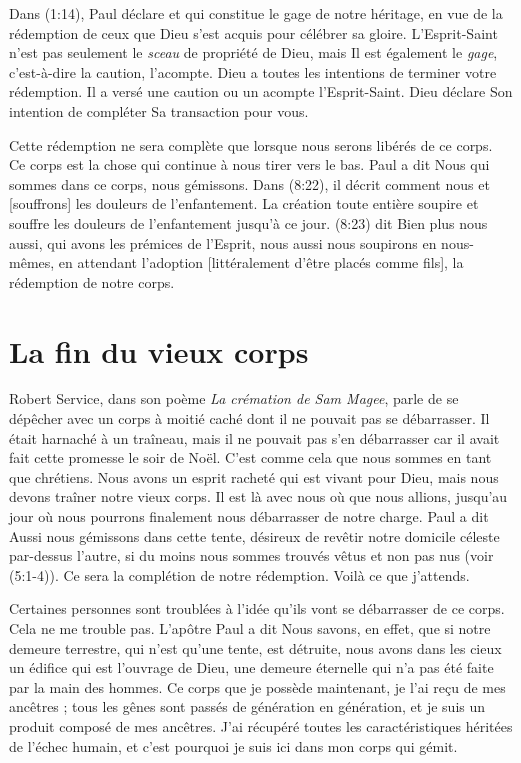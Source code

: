 Dans (1:14), Paul déclare\frcolon{}
 \Og [\dots{}] et qui constitue le gage de notre héritage,
 en vue de la rédemption de ceux que Dieu s'est acquis
 pour célébrer sa gloire. \Fg{}
 L'Esprit-Saint n'est pas seulement le \emph{sceau} de propriété de Dieu,
 mais Il est également le \emph{gage}, c'est-à-dire la caution, l'acompte.
 Dieu a toutes les intentions de terminer votre rédemption.
 Il a versé une caution ou un acompte\frcolon{} l'Esprit-Saint.
 Dieu déclare Son intention de compléter Sa transaction pour vous.

Cette rédemption ne sera complète que lorsque nous serons libérés
 de ce corps.
 Ce corps est la chose qui continue à nous tirer vers le bas.
 Paul a dit\frcolon{}
 \Og Nous qui sommes dans ce corps, nous gémissons. \Fg{}
 Dans (8:22), il décrit comment nous
 \Og [soupirons] et [souffrons] les douleurs de l'enfantement. \Fg{}
 La création toute entière soupire et souffre
 les douleurs de l'enfantement jusqu'à ce jour.
 (8:23) dit\frcolon{}
 \Og Bien plus\frcolon{} nous aussi, qui avons les prémices de l'Esprit,
 nous aussi nous soupirons en nous-mêmes, en attendant l'adoption
 [littéralement\frcolon{} d'être placés comme fils],
 la rédemption de notre corps. \Fg{}


\section{La fin du vieux corps}

Robert Service, dans son poème \emph{La crémation de Sam Magee},
 parle de se dépêcher \Og avec un corps à moitié caché
 dont il ne pouvait pas se débarrasser. \Fg{}
 Il était harnaché à un traîneau, mais il ne pouvait pas s'en débarrasser
 car il avait fait cette promesse le soir de Noël.
 C'est comme cela que nous sommes en tant que chrétiens.
 Nous avons un esprit racheté qui est vivant pour Dieu,
 mais nous devons traîner notre vieux corps.
 Il est là avec nous où que nous allions, jusqu'au jour où nous pourrons
 finalement nous débarrasser de notre charge. Paul a dit\frcolon{}
 \Og Aussi nous gémissons dans cette tente, désireux de revêtir
 notre domicile céleste par-dessus l'autre, si du moins nous sommes
 trouvés vêtus et non pas nus \Fg{} (voir (5:1-4)).
 Ce sera la complétion de notre rédemption. Voilà ce que j'attends.

Certaines personnes sont troublées
 à l'idée qu'ils vont se débarrasser de ce corps. Cela ne me trouble pas.
 L'apôtre Paul a dit\frcolon{}
 \Og  Nous savons, en effet, que si notre demeure terrestre,
 qui n'est qu'une tente, est détruite, nous avons dans les cieux
 un édifice qui est l'ouvrage de Dieu, une demeure éternelle
 qui n'a pas été faite par la main des hommes. \Fg{}
 Ce corps que je possède maintenant, je l'ai reçu de mes ancêtres ;
 tous les gênes sont passés de génération en génération,
 et je suis un produit composé de mes ancêtres.
 J'ai récupéré toutes les caractéristiques héritées de l'échec humain,
 et c'est pourquoi je suis ici dans mon corps qui gémit.


